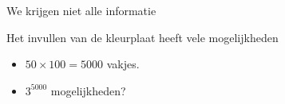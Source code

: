 \documentclass[aspectratio=169,xcolor=dvipsnames]{beamer}
\begin{document}
\begin{frame}{We krijgen niet alle informatie}

\end{frame}
	
	
\begin{frame}{Het invullen van de kleurplaat heeft vele mogelijkheden}

\begin{itemize}
	\item $50 \times 100=5000$ vakjes.
	\item $3^{5000}$ mogelijkheden?
\end{itemize}

	
\end{frame}
	
\end{document}
